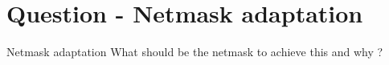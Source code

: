 \section{Question - Netmask adaptation}

\begin{questionBox}{Netmask adaptation}
    What should be the netmask to achieve this and why ?
\end{questionBox}
